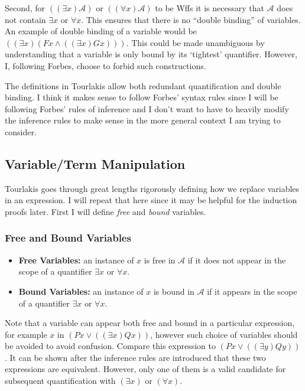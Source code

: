 \documentclass[12pt]{article}
\newcommand{\mc}[1]{\mathcal{#1}}
\begin{document}
Second, for $((\exists x)\mc{A})$ or $((\forall x)\mc{A})$ to be Wffs it is necessary that $\mc{A}$ does not contain $\exists x$ or $\forall x$. This ensures that there is no ``double binding'' of variables. An example of double binding of a variable would be $((\exists x)(Fx \land ((\exists x)Gx)))$. This could be made unambiguous by understanding that a variable is only bound by its `tightest' quantifier. However, I, following Forbes, choose to forbid such constructions.

The definitions in Tourlakis allow both redundant quantification and double binding. I think it makes sense to follow Forbes' syntax rules since I will be following Forbes' rules of inference and I don't want to have to heavily modify the inference rules to make sense in the more general context I am trying to consider.





\subsection*{Variable/Term Manipulation}

Tourlakis goes through great lengths rigorously defining how we replace variables in an expression. I will repeat that here since it may be helpful for the induction proofs later. First I will define \textit{free} and \textit{bound} variables.

\hrulefill

\subsubsection*{Free and Bound Variables}
\begin{itemize}
\item{\textbf{Free Variables:} an instance of $x$ is free in $\mathcal{A}$ if it does not appear in the scope of a quantifier $\exists x$ or $\forall x$.}
\item{\textbf{Bound Variables:} an instance of $x$ is bound in $\mathcal{A}$ if it appears in the scope of a quantifier $\exists x$ or $\forall x$.}
\end{itemize}

\hrulefill

Note that a variable can appear both free and bound in a particular expression, for example $x$ in $(Px \lor ((\exists x)Qx))$, however such choice of variables should be avoided to avoid confusion. Compare this expression to $(Px \lor ((\exists y)Qy))$. It can be shown after the inference rules are introduced that these two expressions are equivalent. However, only one of them is a valid candidate for subsequent quantification with $(\exists x)$ or $(\forall x)$.
\end{document}
